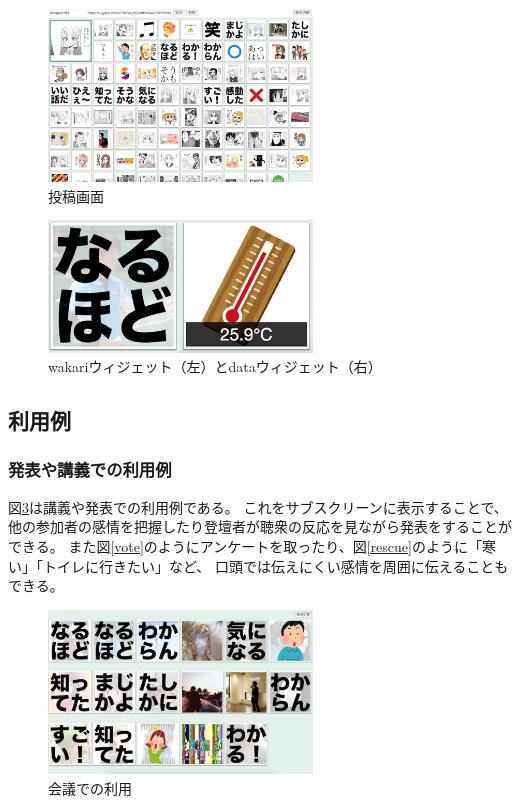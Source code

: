 \begin{figure}[h]
\centering
\includegraphics[width=7cm]{images/console.eps}
\caption{投稿画面}
\label{console}
\end{figure}

\begin{figure}[h]
\centering
\includegraphics[width=7cm]{images/widget.eps}
\caption{wakariウィジェット（左）とdataウィジェット（右）}
\label{widget}
\end{figure}

\subsection{利用例}

\subsubsection{発表や講義での利用例}

図\ref{discussion}は講義や発表での利用例である。
これをサブスクリーンに表示することで、他の参加者の感情を把握したり登壇者が聴衆の反応を見ながら発表をすることができる。
また図\ref{vote}のようにアンケートを取ったり、図\ref{rescue}のように「寒い」「トイレに行きたい」など、
口頭では伝えにくい感情を周囲に伝えることもできる。

\begin{figure}[h]
\centering
\includegraphics[width=7cm]{images/discussion.eps}
\caption{会議での利用}
\label{discussion}
\end{figure}

